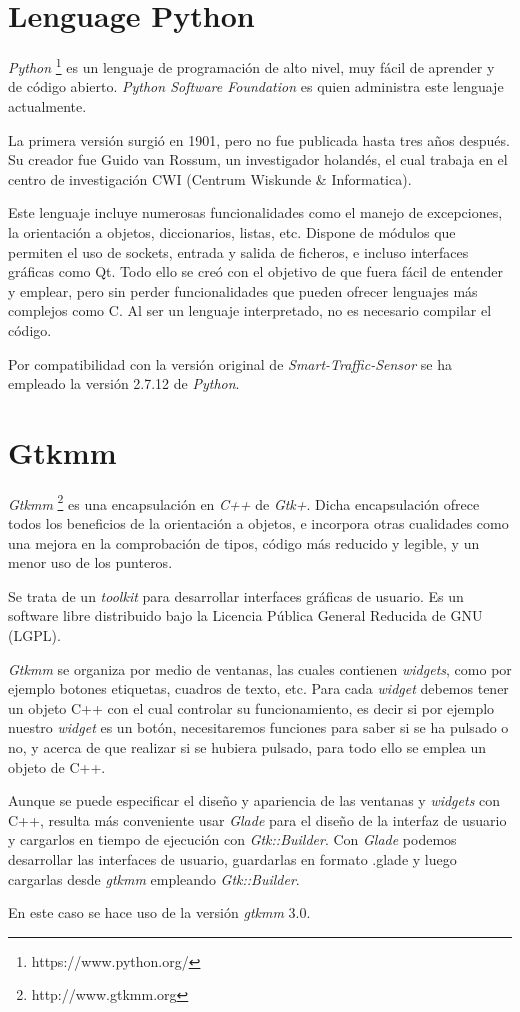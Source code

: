 \section{Lenguage Python}

\textit{Python} \footnote{https://www.python.org/} es un lenguaje de programación de alto nivel, muy fácil de aprender y de código abierto. \textit{Python Software Foundation} es quien administra este lenguaje actualmente.

La primera versión surgió en 1901, pero no fue publicada hasta tres años después. Su creador fue Guido van Rossum, un investigador holandés, el cual trabaja en el centro de investigación CWI (Centrum Wiskunde \& Informatica).

Este lenguaje incluye numerosas funcionalidades como el manejo de excepciones, la orientación a objetos, diccionarios, listas, etc. Dispone de módulos que permiten el uso de sockets, entrada y salida de ficheros, e incluso interfaces gráficas como Qt. Todo ello se creó con el objetivo de que fuera fácil de entender y emplear, pero sin perder funcionalidades que pueden ofrecer lenguajes más complejos como C. Al ser un lenguaje interpretado, no es necesario compilar el código.

Por compatibilidad con la versión original de \textit{Smart-Traffic-Sensor} se ha empleado la versión 2.7.12 de \textit{Python}.

\section{Gtkmm}

\textit{Gtkmm} \footnote{http://www.gtkmm.org} es una encapsulación en \textit{C++} de \textit{Gtk+}. Dicha encapsulación ofrece todos los beneficios de la orientación a objetos, e incorpora otras cualidades como una mejora en la comprobación de tipos, código más reducido y legible, y un menor uso de los punteros. 

Se trata de un \textit{toolkit} para desarrollar interfaces gráficas de usuario. Es un software libre distribuido bajo la Licencia Pública General Reducida de GNU (LGPL).

\textit{Gtkmm} se organiza por medio de ventanas, las cuales contienen \textit{widgets}, como por ejemplo botones etiquetas, cuadros de texto, etc.  Para cada \textit{widget} debemos tener un objeto C++ con el cual controlar su funcionamiento, es decir si por ejemplo nuestro \textit{widget} es un botón, necesitaremos funciones para saber si se ha pulsado o no, y acerca de que realizar si se hubiera pulsado, para todo ello se emplea un objeto de C++. 

Aunque se puede especificar el diseño y apariencia de las ventanas y \textit{widgets} con C++, resulta más conveniente usar \textit{Glade} para el diseño de la interfaz de usuario y cargarlos en tiempo de ejecución con \textit{Gtk::Builder}. Con  \textit{Glade} podemos desarrollar las interfaces de usuario, guardarlas en formato .glade y luego cargarlas desde \textit{gtkmm} empleando \textit{ Gtk::Builder}.

En este caso se hace uso de la versión \textit{gtkmm} 3.0.




